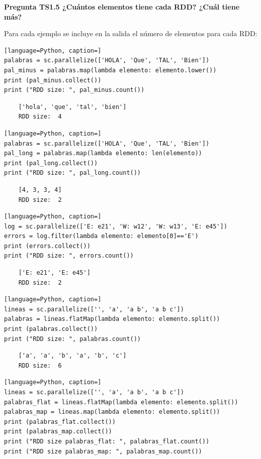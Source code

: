 \documentclass[10pt,swedish, openany]{book}
\begin{document}
\vspace{0.8em}

\textbf{Pregunta TS1.5 ¿Cuántos elementos tiene cada RDD? ¿Cuál tiene más?}

Para cada ejemplo se incluye en la salida el número de elementos para cada RDD:

\begin{lstlisting}[language=Python, caption=]
palabras = sc.parallelize(['HOLA', 'Que', 'TAL', 'Bien'])
pal_minus = palabras.map(lambda elemento: elemento.lower())
print (pal_minus.collect())
print ("RDD size: ", pal_minus.count())
\end{lstlisting}

\begin{verbatim}
    ['hola', 'que', 'tal', 'bien']
    RDD size:  4
\end{verbatim}

\begin{lstlisting}[language=Python, caption=]
palabras = sc.parallelize(['HOLA', 'Que', 'TAL', 'Bien'])
pal_long = palabras.map(lambda elemento: len(elemento))
print (pal_long.collect())
print ("RDD size: ", pal_long.count())
\end{lstlisting}

\begin{verbatim}
    [4, 3, 3, 4]
    RDD size:  2
\end{verbatim}

\begin{lstlisting}[language=Python, caption=]
log = sc.parallelize(['E: e21', 'W: w12', 'W: w13', 'E: e45'])
errors = log.filter(lambda elemento: elemento[0]=='E')
print (errors.collect())
print ("RDD size: ", errors.count())
\end{lstlisting}

\begin{verbatim}
    ['E: e21', 'E: e45']
    RDD size:  2
\end{verbatim}

\begin{lstlisting}[language=Python, caption=]
lineas = sc.parallelize(['', 'a', 'a b', 'a b c'])
palabras = lineas.flatMap(lambda elemento: elemento.split())
print (palabras.collect())
print ("RDD size: ", palabras.count())
\end{lstlisting}

\begin{verbatim}
    ['a', 'a', 'b', 'a', 'b', 'c']
    RDD size:  6
\end{verbatim}

\begin{lstlisting}[language=Python, caption=]
lineas = sc.parallelize(['', 'a', 'a b', 'a b c'])
palabras_flat = lineas.flatMap(lambda elemento: elemento.split())
palabras_map = lineas.map(lambda elemento: elemento.split())
print (palabras_flat.collect())
print (palabras_map.collect())
print ("RDD size palabras_flat: ", palabras_flat.count())
print ("RDD size palabras_map: ", palabras_map.count())
\end{lstlisting}
\end{document}
